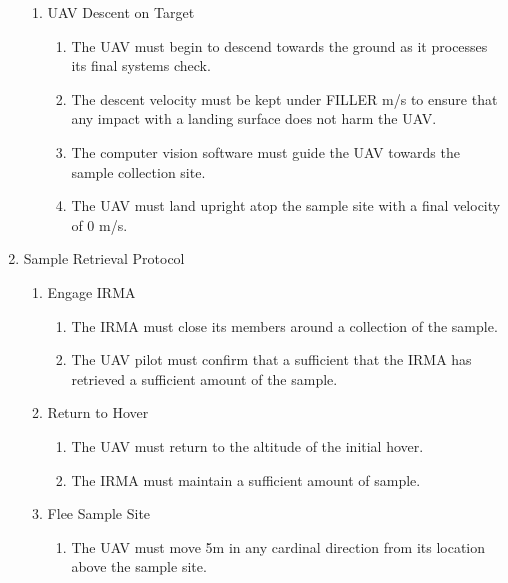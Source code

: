 \begin{enumerate}[noitemsep, label=\arabic*.]
\begin{enumerate}[noitemsep, label=3.\arabic*.]
		\item UAV Descent on Target
		\begin{enumerate}[noitemsep, label=3.3.\arabic*.]
			\item The UAV must begin to descend towards the ground as it processes its final systems check.
			\item The descent velocity must be kept under FILLER m/s to ensure that any impact with a landing surface does not harm the UAV.
			\item The computer vision software must guide the UAV towards the sample collection site.
			\item The UAV must land upright atop the sample site with a final velocity of 0 m/s.
		\end{enumerate}
	\end{enumerate}
	\item Sample Retrieval Protocol
	\begin{enumerate}[noitemsep, label=4.\arabic*.]
		\item Engage IRMA
		\begin{enumerate}[noitemsep, label=4.1.\arabic*.]
			\item The IRMA must close its members around a collection of the sample.
			\item The UAV pilot must confirm that a sufficient that the IRMA has retrieved a sufficient amount of the sample.
		\end{enumerate}
		\item Return to Hover
		\begin{enumerate}[noitemsep, label=4.2.\arabic*.]
			\item The UAV must return to the altitude of the initial hover.
			\item The IRMA must maintain a sufficient amount of sample.
		\end{enumerate}
		\item Flee Sample Site
		\begin{enumerate}[noitemsep, label=4.3.\arabic*.]
			\item The UAV must move 5m in any cardinal direction from its location above the sample site.
		\end{enumerate}
	\end{enumerate}
\end{enumerate}
